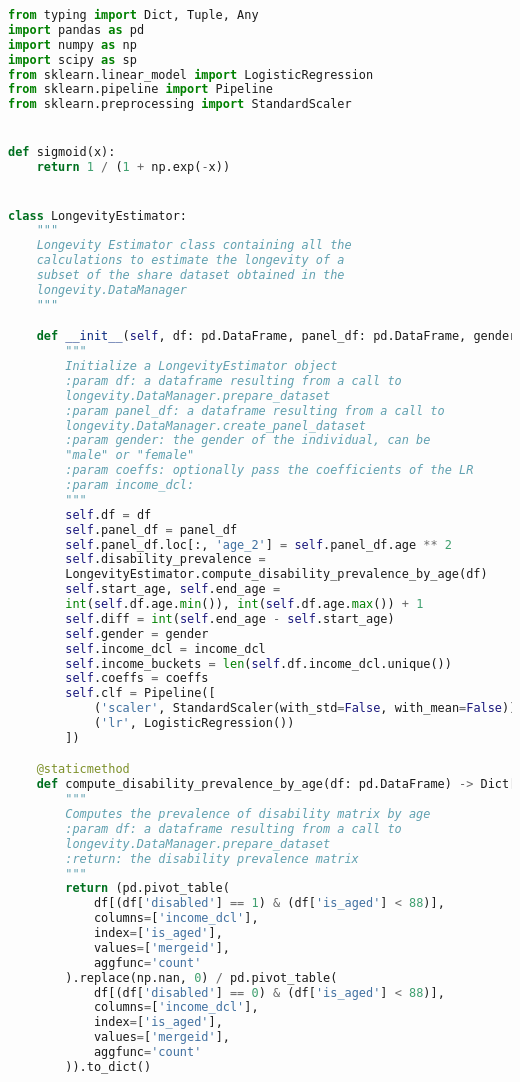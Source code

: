 







\begin{lstlisting}[language=Python]
from typing import Dict, Tuple, Any
import pandas as pd
import numpy as np
import scipy as sp
from sklearn.linear_model import LogisticRegression
from sklearn.pipeline import Pipeline
from sklearn.preprocessing import StandardScaler


def sigmoid(x):
    return 1 / (1 + np.exp(-x))


class LongevityEstimator:
    """
    Longevity Estimator class containing all the
    calculations to estimate the longevity of a
    subset of the share dataset obtained in the
    longevity.DataManager
    """

    def __init__(self, df: pd.DataFrame, panel_df: pd.DataFrame, gender: str, income_dcl: int, coeffs: dict = None):
        """
        Initialize a LongevityEstimator object
        :param df: a dataframe resulting from a call to 
        longevity.DataManager.prepare_dataset
        :param panel_df: a dataframe resulting from a call to
        longevity.DataManager.create_panel_dataset
        :param gender: the gender of the individual, can be
        "male" or "female"
        :param coeffs: optionally pass the coefficients of the LR
        :param income_dcl:
        """
        self.df = df
        self.panel_df = panel_df
        self.panel_df.loc[:, 'age_2'] = self.panel_df.age ** 2
        self.disability_prevalence = 
        LongevityEstimator.compute_disability_prevalence_by_age(df)
        self.start_age, self.end_age = 
        int(self.df.age.min()), int(self.df.age.max()) + 1
        self.diff = int(self.end_age - self.start_age)
        self.gender = gender
        self.income_dcl = income_dcl
        self.income_buckets = len(self.df.income_dcl.unique())
        self.coeffs = coeffs
        self.clf = Pipeline([
            ('scaler', StandardScaler(with_std=False, with_mean=False)),
            ('lr', LogisticRegression())
        ])

    @staticmethod
    def compute_disability_prevalence_by_age(df: pd.DataFrame) -> Dict[Any, Any]:
        """
        Computes the prevalence of disability matrix by age
        :param df: a dataframe resulting from a call to
        longevity.DataManager.prepare_dataset
        :return: the disability prevalence matrix
        """
        return (pd.pivot_table(
            df[(df['disabled'] == 1) & (df['is_aged'] < 88)],
            columns=['income_dcl'],
            index=['is_aged'],
            values=['mergeid'],
            aggfunc='count'
        ).replace(np.nan, 0) / pd.pivot_table(
            df[(df['disabled'] == 0) & (df['is_aged'] < 88)],
            columns=['income_dcl'],
            index=['is_aged'],
            values=['mergeid'],
            aggfunc='count'
        )).to_dict()


\end{lstlisting}
